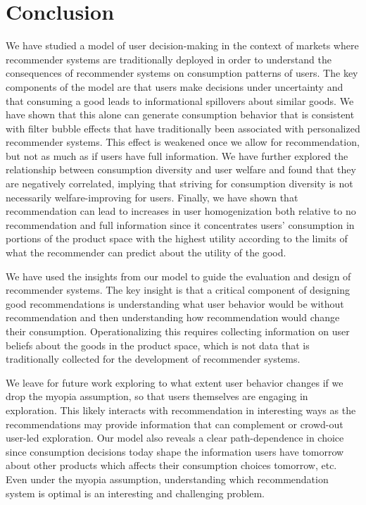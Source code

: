 \documentclass[sigconf]{acmart}
\begin{document}
\section{Conclusion}
We have studied a model of user decision-making in the context of markets where recommender systems are traditionally deployed in order to understand the consequences of recommender systems on consumption patterns of users. The key components of the model are that users make decisions under uncertainty and that consuming a good leads to informational spillovers about similar goods. We have shown that this alone can generate consumption behavior that is consistent with filter bubble effects that have traditionally been associated with personalized recommender systems. This effect is weakened once we allow for recommendation, but not as much as if users have full information. We have further explored the relationship between consumption diversity and user welfare and found that they are negatively correlated, implying that striving for consumption diversity is not necessarily welfare-improving for users. Finally, we have shown that recommendation can lead to increases in user homogenization both relative to no recommendation and full information since it concentrates users' consumption in portions of the product space with the highest utility according to the limits of what the recommender can predict about the utility of the good.
\par

We have used the insights from our model to guide the evaluation and design of recommender systems. The key insight is that a critical component of designing good recommendations is understanding what user behavior would be without recommendation and then understanding how recommendation would change their consumption. Operationalizing this requires collecting information on user beliefs about the goods in the product space, which is not data that is traditionally collected for the development of recommender systems.
\par

We leave for future work exploring to what extent user behavior changes if we drop the myopia assumption, so that users themselves are engaging in exploration. This likely interacts with recommendation in interesting ways as the recommendations may provide information that can complement or crowd-out user-led exploration. Our model also reveals a clear path-dependence in choice since consumption decisions today shape the information users have tomorrow about other products which affects their consumption choices tomorrow, etc. Even under the myopia assumption, understanding which recommendation system is optimal is an interesting and challenging problem.
\par
\end{document}

